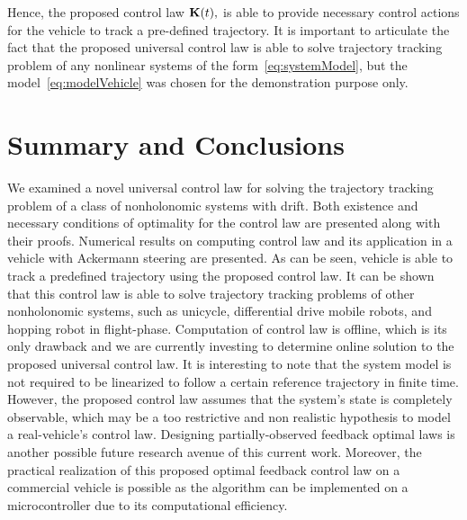 \documentclass[
12pt,draftcls,onecolumn%
]{IEEEtran}
\begin{document}
Hence, the proposed control law ${\bf K}(t),$ is able to provide necessary control actions for the vehicle to track a pre-defined trajectory. It is important to articulate the fact that the proposed universal control law is able to solve trajectory tracking problem of any nonlinear systems of the form~\eqref{eq:systemModel}, but the model~\eqref{eq:modelVehicle} was chosen for the demonstration purpose only. 

 \section{Summary and Conclusions}
 \label{sec:conclusion}
 We examined a novel universal control law for solving the trajectory tracking problem of a class of nonholonomic systems with drift. Both existence and necessary conditions of optimality for the control law are presented along with their proofs. Numerical results on computing control law and its application in a vehicle with Ackermann steering are presented. As can be seen, vehicle is able to track a predefined trajectory using the proposed control law. It can be shown that this control law is able to solve trajectory tracking problems of other nonholonomic systems, such as unicycle, differential drive mobile robots, and hopping robot in flight-phase. Computation of control law is offline, which is its only drawback and we are currently investing to determine online solution to the proposed universal control law.  It is interesting to note that the system model is not required to be linearized to follow a certain reference trajectory in finite time. However, the proposed control law assumes that the system's state is completely observable, which may be a too restrictive and non realistic hypothesis to model a real-vehicle's control law. Designing partially-observed feedback optimal laws is another possible future research avenue of  this current work. Moreover, the practical realization of this proposed optimal feedback control law on a commercial vehicle is possible as the algorithm can be implemented on a microcontroller due to its computational efficiency.



%



\end{document}
